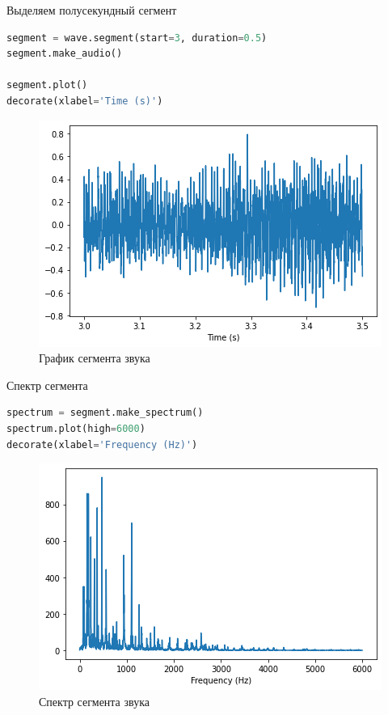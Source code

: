 Выделяем полусекундный сегмент
\begin{lstlisting}[language=Python]
segment = wave.segment(start=3, duration=0.5)
segment.make_audio()

segment.plot()
decorate(xlabel='Time (s)')
\end{lstlisting}

\begin{figure}[H]
	\begin{center}
		\includegraphics[scale=1]{fig/lab01/lab01_02.png}
		\caption{График сегмента звука}
	\end{center}
\end{figure}

Спектр сегмента
\begin{lstlisting}[language=Python]
spectrum = segment.make_spectrum()
spectrum.plot(high=6000)
decorate(xlabel='Frequency (Hz)')
\end{lstlisting}

\begin{figure}[H]
	\begin{center}
		\includegraphics[scale=1]{fig/lab01/lab01_03.png}
		\caption{Спектр сегмента звука}
	\end{center}
\end{figure}

